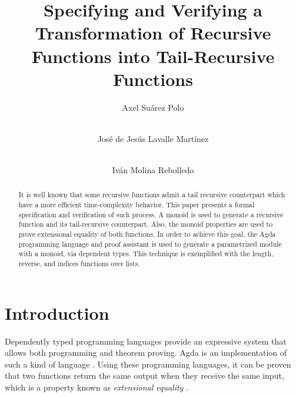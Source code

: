 \documentclass[runningheads]{llncs}
\begin{document}
\title{Specifying and Verifying a Transformation of Recursive Functions into
       Tail-Recursive Functions}

\author{ Axel Suárez Polo \and \\
         José de Jesús Lavalle Martínez \and \\
         Iván Molina Rebolledo
    }



\maketitle

\begin{abstract}

It is well known that some recursive functions admit a tail recursive counterpart which
have a more efficient time-complexity behavior. This paper presents a formal
specification and verification of such process. A monoid is used to generate a recursive
function and its tail-recursive counterpart. Also, the monoid properties are used to
prove extensional equality of both functions. In order to achieve this goal, the Agda
programming language and proof assistant is used to generate a parametrized module with a
monoid, via dependent types. This technique is exemplified with the length, reverse, and
indices functions over lists.

\end{abstract}

\section{Introduction}

Dependently typed programming languages provide an expressive system that allows both
programming and theorem proving. Agda is an implementation of such a kind of language
\cite{bove2009brief}. Using these programming languages, it can be proven that two
functions return the same output when they receive the same input, which is a property
known as \emph{extensional equality} \cite{botta2021extensional}.
\end{document}
